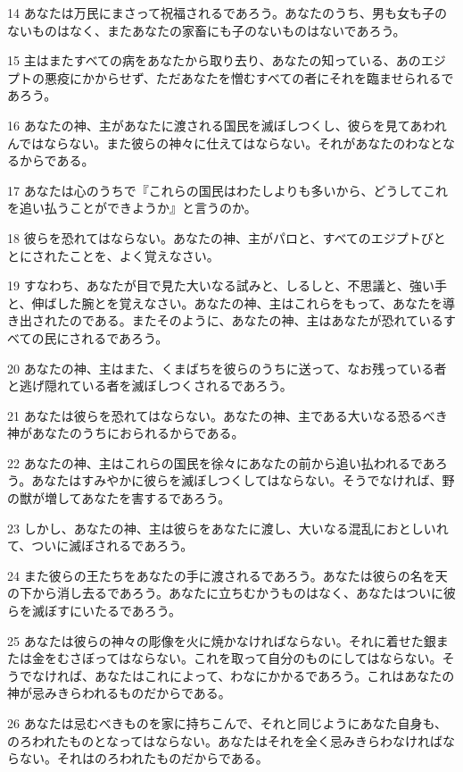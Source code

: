 \par 14 あなたは万民にまさって祝福されるであろう。あなたのうち、男も女も子のないものはなく、またあなたの家畜にも子のないものはないであろう。
\par 15 主はまたすべての病をあなたから取り去り、あなたの知っている、あのエジプトの悪疫にかからせず、ただあなたを憎むすべての者にそれを臨ませられるであろう。
\par 16 あなたの神、主があなたに渡される国民を滅ぼしつくし、彼らを見てあわれんではならない。また彼らの神々に仕えてはならない。それがあなたのわなとなるからである。
\par 17 あなたは心のうちで『これらの国民はわたしよりも多いから、どうしてこれを追い払うことができようか』と言うのか。
\par 18 彼らを恐れてはならない。あなたの神、主がパロと、すべてのエジプトびととにされたことを、よく覚えなさい。
\par 19 すなわち、あなたが目で見た大いなる試みと、しるしと、不思議と、強い手と、伸ばした腕とを覚えなさい。あなたの神、主はこれらをもって、あなたを導き出されたのである。またそのように、あなたの神、主はあなたが恐れているすべての民にされるであろう。
\par 20 あなたの神、主はまた、くまばちを彼らのうちに送って、なお残っている者と逃げ隠れている者を滅ぼしつくされるであろう。
\par 21 あなたは彼らを恐れてはならない。あなたの神、主である大いなる恐るべき神があなたのうちにおられるからである。
\par 22 あなたの神、主はこれらの国民を徐々にあなたの前から追い払われるであろう。あなたはすみやかに彼らを滅ぼしつくしてはならない。そうでなければ、野の獣が増してあなたを害するであろう。
\par 23 しかし、あなたの神、主は彼らをあなたに渡し、大いなる混乱におとしいれて、ついに滅ぼされるであろう。
\par 24 また彼らの王たちをあなたの手に渡されるであろう。あなたは彼らの名を天の下から消し去るであろう。あなたに立ちむかうものはなく、あなたはついに彼らを滅ぼすにいたるであろう。
\par 25 あなたは彼らの神々の彫像を火に焼かなければならない。それに着せた銀または金をむさぼってはならない。これを取って自分のものにしてはならない。そうでなければ、あなたはこれによって、わなにかかるであろう。これはあなたの神が忌みきらわれるものだからである。
\par 26 あなたは忌むべきものを家に持ちこんで、それと同じようにあなた自身も、のろわれたものとなってはならない。あなたはそれを全く忌みきらわなければならない。それはのろわれたものだからである。

